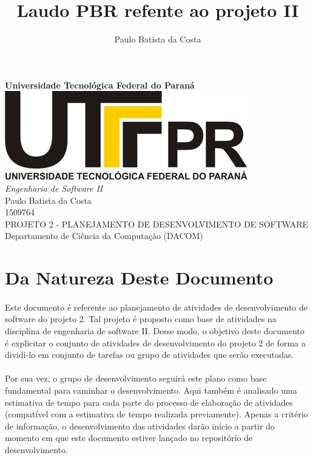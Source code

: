 \documentclass[12pt,a4paper]{article}
\author{Paulo Batista da Costa}
\title{Laudo PBR refente ao projeto II }
\begin{document}
	
        \begin{titlepage}
        \LARGE
        	\begin{center}
        	\vspace{5cm} 
        	\textbf{Universidade Tecnológica Federal do Paraná \\ \vspace{1.8cm}}
        	\includegraphics[scale=0.35]{logoutfpr.jpg} \\ \vspace{1.8cm}
        	\textit{Engenharia de Software II} \vspace{2cm} \\
        	Paulo Batista da Costa \\ 1509764 \vspace{2cm} \\ 
        	PROJETO 2 - PLANEJAMENTO DE DESENVOLVIMENTO DE SOFTWARE \vspace{2cm} \\
        	Departamento de Ciência da Computação (DACOM) 
        	
        	\end{center}
        \end{titlepage}	
	
		\tableofcontents
		\newpage
		\section{Da Natureza Deste Documento}
		\paragraph{} Este documento é referente ao planejamento de atividades de desenvolvimento de software do projeto 2. Tal projeto é proposto como base de atividades na disciplina de engenharia de software II. Desse modo, o objetivo deste documento é explicitar o conjunto de atividades de desenvolvimento do projeto 2 de forma a dividi-lo em conjunto de tarefas ou grupo de atividades que serão executadas. 
		
		\paragraph{} Por sua vez, o grupo de desenvolvimento seguirá este plano como base fundamental para caminhar o desenvolvimento. Aqui também é analisado uma estimativa de tempo para cada parte do processo de elaboração de atividades (compatível com a estimativa de tempo realizada previamente). Apenas a critério de informação, o desenvolvimento das atividades darão início  a partir do momento em que este documento estiver lançado no repositório de desenvolvimento.
\end{document}
